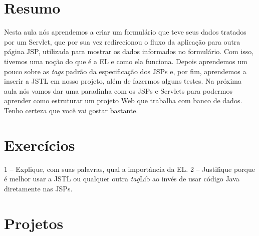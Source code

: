 \section{Resumo}

Nesta aula nós aprendemos a criar um formulário que teve seus dados tratados por um Servlet, que por sua vez redirecionou o fluxo da aplicação para outra página JSP, utilizada para mostrar os dados informados no formulário. Com isso, tivemos uma noção do que é a EL e como ela funciona. Depois aprendemos um pouco sobre as \textit{tags} padrão da especificação dos JSPs e, por fim, aprendemos a inserir a JSTL em nosso projeto, além de fazermos alguns testes. Na próxima aula nós vamos dar uma paradinha com os JSPs e Servlets para podermos aprender como estruturar um projeto Web que trabalha com banco de dados. Tenho certeza que você vai gostar bastante.


\section{Exercícios}

1 – Explique, com suas palavras, qual a importância da EL.
2 – Justifique porque é melhor usar a JSTL ou qualquer outra \textit{tag}Lib ao invés de usar código Java diretamente nas JSPs.

\section{Projetos}


